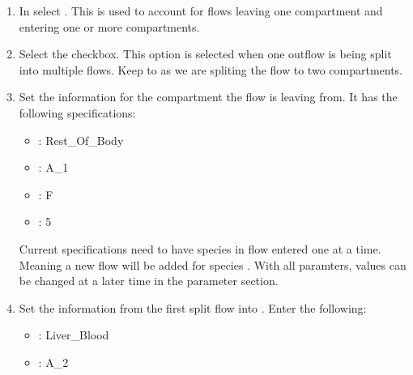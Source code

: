 \documentclass[letterpaper,10pt,english]{sphinxmanual}
\begin{document}
\begin{figure}[htbp]
\centering

\noindent{}
\end{figure}
\begin{enumerate}
%
\item {} 
\sphinxAtStartPar
In  select . This is used to account
for flows leaving one compartment and entering one or more compartments.

\item {} 
\sphinxAtStartPar
Select the  checkbox. This option is selected when one outflow
is being split into multiple flows.  Keep  to  as
we are spliting the flow to two compartments.

\item {} 
\sphinxAtStartPar
Set the information for the compartment the flow is leaving from. It has the
following specifications:
\begin{itemize}
\item {} 
\sphinxAtStartPar
{}: Rest\_Of\_Body

\item {} 
\sphinxAtStartPar
{}: A\_1

\item {} 
\sphinxAtStartPar
{}: F

\item {} 
\sphinxAtStartPar
{}: 5

\end{itemize}

\sphinxAtStartPar
Current specifications need to have species in flow entered one at a time.
Meaning a new flow will be added for species . With all paramters,
values can be changed at a later time in the parameter section.

\item {} 
\sphinxAtStartPar
Set the information from the first split flow into . Enter
the following:
\begin{itemize}
\item {} 
\sphinxAtStartPar
{}: Liver\_Blood

\item {} 
\sphinxAtStartPar
{}: A\_2


\end{itemize}
\end{enumerate}
\end{document}
